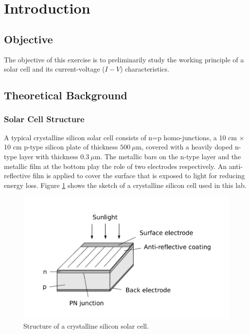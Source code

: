 \documentclass{article}
\begin{document}
		\section{Introduction}
	\subsection{Objective}
The objective of this exercise is to preliminarily study the working principle of a solar cell and its current-voltage ($I-V$) characteristics.

	\subsection{Theoretical Background}
\subsubsection{Solar Cell Structure}
A typical crystalline silicon solar cell consists of n=p homo-junctions, a 10 cm $\times$ 10 cm p-type silicon plate of thickness $500~\mu$m, covered with a heavily doped n-type layer with thickness $0.3~\mu$m. The metallic bars on the n-type layer and the metallic film at the bottom play the role of two electrodes respectively. An anti-reflective film is applied to cover the surface that is exposed to light for reducing energy loss. Figure \ref{fig.solar cell} shows the sketch of a crystalline silicon cell used in this lab.

\begin{figure}[H]
\centering
\includegraphics[scale=0.6]{solar cell}
\caption{Structure of a crystalline silicon solar cell.}\label{fig.solar cell}
\end{figure}
\end{document}
